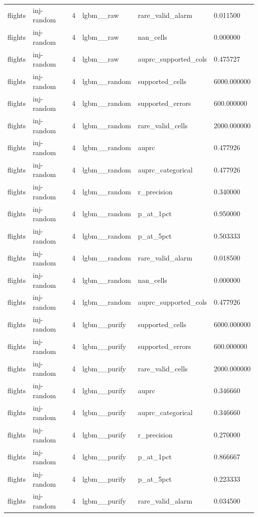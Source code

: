 \begin{tabular}{llllll}
flights & inj-random & 4 & lgbm\_\_raw & rare\_valid\_alarm & 0.011500 \\
flights & inj-random & 4 & lgbm\_\_raw & nan\_cells & 0.000000 \\
flights & inj-random & 4 & lgbm\_\_raw & auprc\_supported\_cols & 0.475727 \\
flights & inj-random & 4 & lgbm\_\_random & supported\_cells & 6000.000000 \\
flights & inj-random & 4 & lgbm\_\_random & supported\_errors & 600.000000 \\
flights & inj-random & 4 & lgbm\_\_random & rare\_valid\_cells & 2000.000000 \\
flights & inj-random & 4 & lgbm\_\_random & auprc & 0.477926 \\
flights & inj-random & 4 & lgbm\_\_random & auprc\_categorical & 0.477926 \\
flights & inj-random & 4 & lgbm\_\_random & r\_precision & 0.340000 \\
flights & inj-random & 4 & lgbm\_\_random & p\_at\_1pct & 0.950000 \\
flights & inj-random & 4 & lgbm\_\_random & p\_at\_5pct & 0.503333 \\
flights & inj-random & 4 & lgbm\_\_random & rare\_valid\_alarm & 0.018500 \\
flights & inj-random & 4 & lgbm\_\_random & nan\_cells & 0.000000 \\
flights & inj-random & 4 & lgbm\_\_random & auprc\_supported\_cols & 0.477926 \\
flights & inj-random & 4 & lgbm\_\_purify & supported\_cells & 6000.000000 \\
flights & inj-random & 4 & lgbm\_\_purify & supported\_errors & 600.000000 \\
flights & inj-random & 4 & lgbm\_\_purify & rare\_valid\_cells & 2000.000000 \\
flights & inj-random & 4 & lgbm\_\_purify & auprc & 0.346660 \\
flights & inj-random & 4 & lgbm\_\_purify & auprc\_categorical & 0.346660 \\
flights & inj-random & 4 & lgbm\_\_purify & r\_precision & 0.270000 \\
flights & inj-random & 4 & lgbm\_\_purify & p\_at\_1pct & 0.866667 \\
flights & inj-random & 4 & lgbm\_\_purify & p\_at\_5pct & 0.223333 \\
flights & inj-random & 4 & lgbm\_\_purify & rare\_valid\_alarm & 0.034500 \\

\end{tabular}
